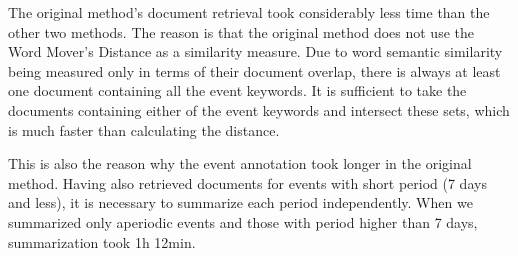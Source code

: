 \hspace{\fill}

The original method's document retrieval took considerably less time than the other two methods. The reason is that the original method does not use the Word Mover's Distance as a similarity measure. Due to word semantic similarity being measured only in terms of their document overlap, there is always at least one document containing all the event keywords. It is sufficient to take the documents containing either of the event keywords and intersect these sets, which is much faster than calculating the distance.

This is also the reason why the event annotation took longer in the original method. Having also retrieved documents for events with short period (7 days and less), it is necessary to summarize each period independently. When we summarized only aperiodic events and those with period higher than 7 days, summarization took 1h 12min.

